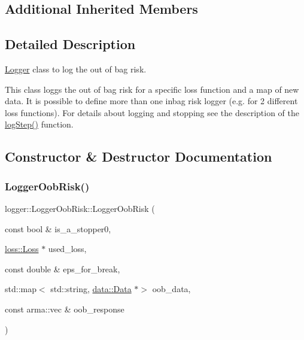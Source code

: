 \subsection*{Additional Inherited Members}


\subsection{Detailed Description}
\mbox{\hyperlink{classlogger_1_1_logger}{Logger}} class to log the out of bag risk. 

This class loggs the out of bag risk for a specific loss function and a map of new data. It is possible to define more than one inbag risk logger (e.\+g. for 2 different loss functions). For details about logging and stopping see the description of the {\ttfamily \mbox{\hyperlink{classlogger_1_1_logger_oob_risk_a4b0ea670a7970bca31037efab99cc06a}{log\+Step()}}} function. 

\subsection{Constructor \& Destructor Documentation}
\mbox{\label{classlogger_1_1_logger_oob_risk_a2ade553132c86f485d0057b2808ab028}} 
\subsubsection{\texorpdfstring{Logger\+Oob\+Risk()}{LoggerOobRisk()}}
{\footnotesize\ttfamily logger\+::\+Logger\+Oob\+Risk\+::\+Logger\+Oob\+Risk (\begin{DoxyParamCaption}\item[{const bool \&}]{is\+\_\+a\+\_\+stopper0,  }\item[{\mbox{\hyperlink{classloss_1_1_loss}{loss\+::\+Loss}} $\ast$}]{used\+\_\+loss,  }\item[{const double \&}]{eps\+\_\+for\+\_\+break,  }\item[{std\+::map$<$ std\+::string, \mbox{\hyperlink{classdata_1_1_data}{data\+::\+Data}} $\ast$$>$}]{oob\+\_\+data,  }\item[{const arma\+::vec \&}]{oob\+\_\+response }\end{DoxyParamCaption})}



